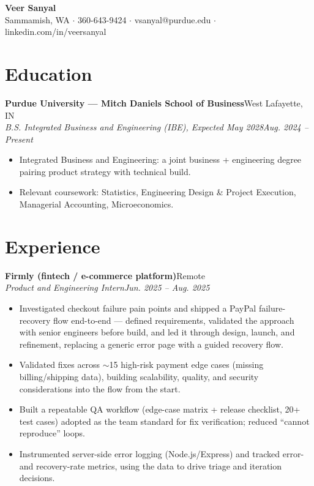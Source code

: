 \documentclass[10pt,letterpaper]{article}
\newcommand{\entry}[4]{%
  \textbf{#1}\hfill #2\\[1pt]
  \textit{#3}\hfill \textit{#4}\\[2pt]
}
\begin{document}
\begin{center}
  {\LARGE \textbf{Veer Sanyal}}\\[3pt]
  Sammamish, WA $\cdot$ 360-643-9424 $\cdot$ vsanyal@purdue.edu $\cdot$ linkedin.com/in/veersanyal
\end{center}

\section*{Education}
\textbf{Purdue University --- Mitch Daniels School of Business}\hfill West Lafayette, IN\\[1pt]
\textit{B.S. Integrated Business and Engineering (IBE), Expected May 2028}\hfill \textit{Aug. 2024 -- Present}
\begin{itemize}
  \item Integrated Business and Engineering: a joint business + engineering degree pairing product strategy with technical build.
  \item Relevant coursework: Statistics, Engineering Design \& Project Execution, Managerial Accounting, Microeconomics.
\end{itemize}

\section*{Experience}
\entry{Firmly (fintech / e-commerce platform)}{Remote}{Product and Engineering Intern}{Jun. 2025 -- Aug. 2025}
\begin{itemize}
  \item Investigated checkout failure pain points and shipped a PayPal failure-recovery flow end-to-end --- defined requirements, validated the approach with senior engineers before build, and led it through design, launch, and refinement, replacing a generic error page with a guided recovery flow.
  \item Validated fixes across $\sim$15 high-risk payment edge cases (missing billing/shipping data), building scalability, quality, and security considerations into the flow from the start.
  \item Built a repeatable QA workflow (edge-case matrix + release checklist, 20+ test cases) adopted as the team standard for fix verification; reduced ``cannot reproduce'' loops.
  \item Instrumented server-side error logging (Node.js/Express) and tracked error- and recovery-rate metrics, using the data to drive triage and iteration decisions.
\end{itemize}
\end{document}
